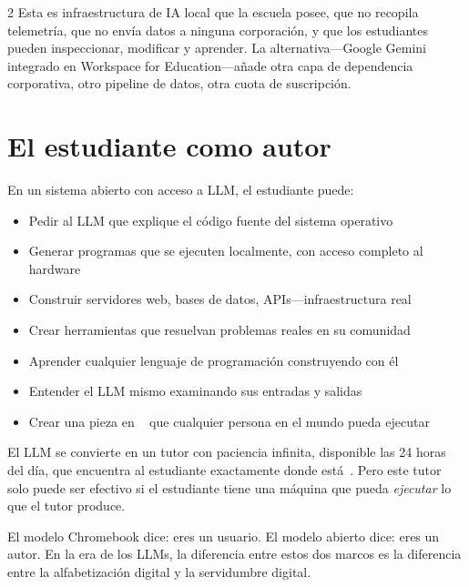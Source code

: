 \documentclass[11pt, a4paper]{article}
\begin{document}
\begin{multicols}{2}
Esta es infraestructura de IA local que la escuela posee, que no recopila telemetría, que no envía datos a ninguna corporación, y que los estudiantes pueden inspeccionar, modificar y aprender. La alternativa---Google Gemini integrado en Workspace for Education---añade otra capa de dependencia corporativa, otro pipeline de datos, otra cuota de suscripción.


\section{El estudiante como autor}

En un sistema abierto con acceso a LLM, el estudiante puede:

\begin{itemize}
  \item Pedir al LLM que explique el código fuente del sistema operativo
  \item Generar programas que se ejecuten localmente, con acceso completo al hardware
  \item Construir servidores web, bases de datos, APIs---infraestructura real
  \item Crear herramientas que resuelvan problemas reales en su comunidad
  \item Aprender cualquier lenguaje de programación construyendo con él
  \item Entender el LLM mismo examinando sus entradas y salidas
  \item Crear una pieza en \ac{}~\citep{scudder2026ac} que cualquier persona en el mundo pueda ejecutar
\end{itemize}

El LLM se convierte en un tutor con paciencia infinita, disponible las 24 horas del día, que encuentra al estudiante exactamente donde está~\citep{khan2024bravenew}. Pero este tutor solo puede ser efectivo si el estudiante tiene una máquina que pueda \emph{ejecutar} lo que el tutor produce.

El modelo Chromebook dice: eres un usuario. El modelo abierto dice: eres un autor. En la era de los LLMs, la diferencia entre estos dos marcos es la diferencia entre la alfabetización digital y la servidumbre digital.



\end{multicols}
\end{document}
